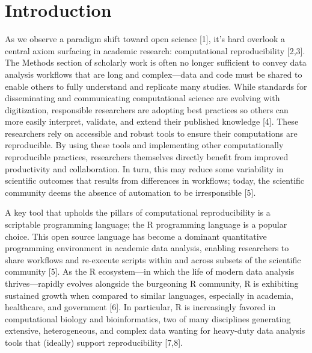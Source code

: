 \documentclass[10pt,letterpaper]{article}
\begin{document}
\hypertarget{introduction}{%
\section{Introduction}\label{introduction}}

As we observe a paradigm shift toward open science {[}1{]}, it's hard
overlook a central axiom surfacing in academic research: computational
reproducibility {[}2,3{]}. The Methods section of scholarly work is
often no longer sufficient to convey data analysis workflows that are
long and complex---data and code must be shared to enable others to
fully understand and replicate many studies. While standards for
disseminating and communicating computational science are evolving with
digitization, responsible researchers are adopting best practices so
others can more easily interpret, validate, and extend their published
knowledge {[}4{]}. These researchers rely on accessible and robust tools
to ensure their computations are reproducible. By using these tools and
implementing other computationally reproducible practices, researchers
themselves directly benefit from improved productivity and
collaboration. In turn, this may reduce some variability in scientific
outcomes that results from differences in workflows; today, the
scientific community deems the absence of automation to be irresponsible
{[}5{]}.

A key tool that upholds the pillars of computational reproducibility is
a scriptable programming language; the R programming language is a
popular choice. This open source language has become a dominant
quantitative programming environment in academic data analysis, enabling
researchers to share workflows and re-execute scripts within and across
subsets of the scientific community {[}5{]}. As the R ecosystem---in
which the life of modern data analysis thrives---rapidly evolves
alongside the burgeoning R community, R is exhibiting sustained growth
when compared to similar languages, especially in academia, healthcare,
and government {[}6{]}. In particular, R is increasingly favored in
computational biology and bioinformatics, two of many disciplines
generating extensive, heterogeneous, and complex data wanting for
heavy-duty data analysis tools that (ideally) support reproducibility
{[}7,8{]}.
\end{document}
